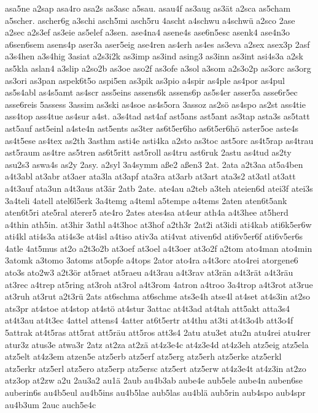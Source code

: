 {asa5ne
a2sap
asa4ro
asa2s
as3asc
a5sau.
asau4f
as3aug
as3ät
a2sca
as5cham
a5scher.
ascher6g
a3schi
asch5mi
asch5ru
4ascht
a4schwu
a4schwü
a2sco
2ase
a2sec
a2s3ef
as3eie
as5elef
a3sen.
ase4na4
asene4s
ase6n5esc
asenk4
ase4n3o
a6sen6sem
asens4p
aser3a
aser5eig
ase4ren
as4erh
as4es
as3eva
a2sex
asex3p
2asf
a3s4hen
a3s4hig
3asiat
a2s3i2k
as3imp
as3ind
asing3
as3inn
as3int
asi4s3a
a2sk
as5kla
aslan4
a3slip
a2so2b
as3oe
aso2f
as3ofe
a3sol
a3som
a2s3o2p
as3orc
as3org
as3ori
as3pan
aspek6t5o
aspi5en
as3pik
as3pio
a4spir
as4ple
as4por
as4pul
as5s4abl
as4s5amt
as4scr
ass5eins
assens6k
assens6p
as5s4er
asser5a
asse6r5ec
asse6reis
5assess
3assim
as3ski
as4soe
as4s5ora
3assoz
as2sö
as4spo
as2st
ass4tie
ass4top
ass4tue
as4sur
a4st.
a3s4tad
ast4af
ast5ans
ast5ant
as3tap
asta3s
as5tatt
ast5auf
ast5einl
a4ste4n
ast5ents
as3ter
as6t5er6ho
as6t5er6hö
aster5oe
aste4s
as4t5ese
as4tex
as2th
3asthm
asti4e
asti4ka
a2sto
as3toc
ast5orc
as4t5rap
as4trau
ast5raum
as4tre
as5tren
as6t5ritt
ast5roll
as4tru
ast6ruk
2astu
as4tud
as2ty
asu2s3
aswa4s
as2y
2asy.
a2syl
3a4symm
aße2
aßen3
2at.
2ata
a2t3aa
at5a4ben
a4t3abl
at3abr
at3aer
ata3la
at3apf
ata3ra
at3arb
at3art
ata3s2
at3atl
at3att
a4t3auf
ata3un
a4t3aus
at3är
2atb
2ate.
ate4au
a2teb
a3teh
ateien6d
atei3f
atei3s
3a4teli
4atell
atel6l5erk
3a4temg
a4teml
a5tempe
a4tems
2aten
aten6t5ank
aten6t5ri
ate5ral
aterer5
ate4ro
2ates
ates4sa
at4eur
ath4a
a4t3hee
at5herd
a4thin
ath5in.
at3hir
3athl
a4t3hoc
at3hof
a2th3r
2at2i
at3idi
ati4kab
ati6k5er6w
ati4kl
ati4s3a
ati4s3e
at4isl
a4tiso
ativ3a
ati4vat
ativen6d
ati6v5er6f
ati6v5er6s
4atle
4at5mus
at2o
a2t3o2b
at3oef
at3oel
a4t3oer
at3o2f
a2tom
ato4man
ato4min
3atomk
a3tomo
3atoms
at5opfe
a4tops
2ator
ato4ra
a4t3orc
ato4rei
atorgene6
ato3s
ato2w3
a2t3ör
at5raet
at5raeu
a4t3rau
a4t3rav
at3rän
a4t3rät
a4t3räu
at3rec
a4trep
at5ring
at3roh
at3rol
a4t3rom
4atron
a4troo
3a4trop
a4t3rot
at3rue
at3ruh
at3rut
a2t3rü
2ats
at6schma
at6schme
ats3e4h
atse4l
at4set
at4s3in
at2so
ats3pr
at4stoe
at4stop
at4stö
at4stur
3attac
at4t3ad
at4tah
att5akt
atta3s4
at4t3au
at4t3ec
4attel
attens4
4atter
at6t5ertr
at4thu
at3ti
at4t3o4b
att3o4f
5attrak
at4t5ras
att5rat
att5räu
att5ros
att3s4
2atu
atu3et
atu2n
atu4rei
atu4rer
atur3z
atus3e
atwa3r
2atz
at2za
at2zä
at4z3e4c
at4z3e4d
at4z3eh
atz5eig
atz5ela
atz5elt
at4z3em
atzen5e
atz5erb
atz5erf
atz5erg
atz5erh
atz5erke
atz5erkl
atz5erkr
atz5erl
atz5ero
atz5erp
atz5ersc
atz5ert
atz5erw
at4z3e4t
at4z3in
at2zo
atz3op
at2zw
a2u
2au3a2
au1ä
2aub
au4b3ab
aube4e
aub5ele
aube4n
auben6se
auberin6s
au4b5eul
au4b5ins
au4b5lae
aub5las
au4blä
aub5rin
aub4spo
aub4spr
au4b3um
2auc
auch5e4c
}
